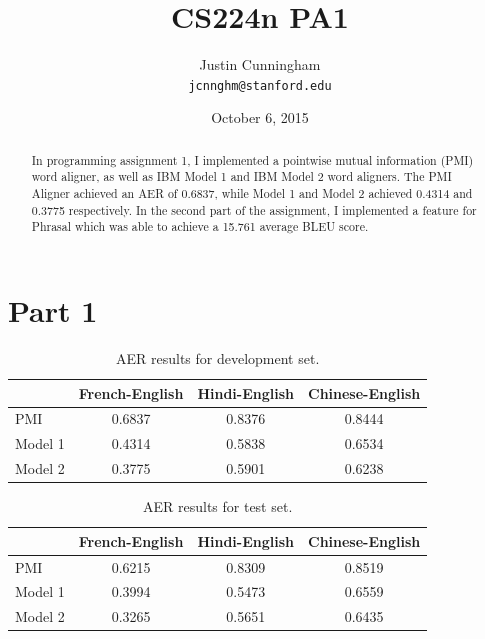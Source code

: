 \documentclass[11pt]{article}
\title{CS224n PA1}
\author{Justin Cunningham \\
  {\tt jcnnghm@stanford.edu}}
\date{October 6, 2015}
\begin{document}
\maketitle
\begin{abstract}
  In programming assignment 1, I implemented a pointwise mutual
  information (PMI) word aligner, as well as IBM Model 1 and
  IBM Model 2 word aligners.  The PMI Aligner achieved an AER of
  0.6837, while Model 1 and Model 2 achieved 0.4314
  and 0.3775 respectively.  In the second part of the assignment,
  I implemented a feature for Phrasal which was able to achieve a
  15.761 average BLEU score.
\end{abstract}

\section{Part 1}

\begin{table}
  \begin{center}
    \begin{tabular}{ l c c c }
      \hline
      & French-English & Hindi-English & Chinese-English \\
      \hline
      PMI     & 0.6837 & 0.8376 & 0.8444 \\
      Model 1 & 0.4314 & 0.5838 & 0.6534 \\
      Model 2 & 0.3775 & 0.5901 & 0.6238 \\
      \hline
    \end{tabular}
  \end{center}
  \caption{AER results for development set.}
  \label{table:dev}
\end{table}

\begin{table}
  \begin{center}
    \begin{tabular}{ l c c c }
      \hline
      & French-English & Hindi-English & Chinese-English \\
      \hline
      PMI     & 0.6215 & 0.8309 & 0.8519 \\
      Model 1 & 0.3994 & 0.5473 & 0.6559 \\
      Model 2 & 0.3265 & 0.5651 & 0.6435 \\
      \hline
    \end{tabular}
  \end{center}
  \caption{AER results for test set.}
  \label{table:test}
\end{table}
\end{document}
